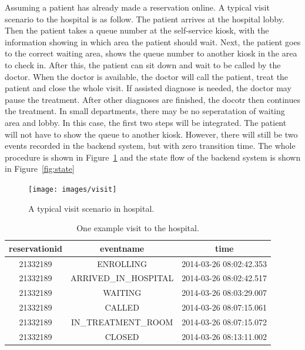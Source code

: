 Assuming a patient has already made a reservation online. A typical visit scenario to the hospital is as follow. The patient arrives at the hospital lobby. Then the patient takes a queue number at the self-service kiosk, with the information showing in which area the patient should wait. Next, the patient goes to the correct waiting area, shows the queue number to another kiosk in the area to check in. After this, the patient can sit down and wait to be called by the doctor. When the doctor is available, the doctor will call the patient, treat the patient and close the whole visit. If assisted diagnose is needed, the doctor may pause the treatment. After other diagnoses are finished, the docotr then continues the treatment. In small departments, there may be no seperatation of waiting area and lobby. In this case, the first two steps will be integrated. The patient will not have to show the queue to another kiosk. However, there will still be two events recorded in the backend system, but with zero transition time. The whole procedure is shown in Figure~\ref{fig:visit} and the state flow of the backend system is shown in Figure~\ref{fig:state}

\begin{figure}
	\begin{center}
		\texttt{[image: images/visit]}
		\caption{A typical visit scenario in hospital.}
		\label{fig:visit}
	\end{center}
\end{figure}

\begin{table}
	\caption{One example visit to the hospital.}
	\label{table:example}
	\begin{tabular}{|c|c|c|}
		\hline
		 reservationid &      eventname      &          time	\\ \hline

	      21332189 & ENROLLING           & 2014-03-26 08:02:42.353	\\ \hline
	      21332189 & ARRIVED\_IN\_HOSPITAL & 2014-03-26 08:02:42.517	\\ \hline
    	  21332189 & WAITING             & 2014-03-26 08:03:29.007	\\ \hline
	      21332189 & CALLED              & 2014-03-26 08:07:15.061	\\ \hline
    	  21332189 & IN\_TREATMENT\_ROOM   & 2014-03-26 08:07:15.072	\\ \hline
	      21332189 & CLOSED              & 2014-03-26 08:13:11.002	\\ \hline
	\end{tabular}
\end{table}

